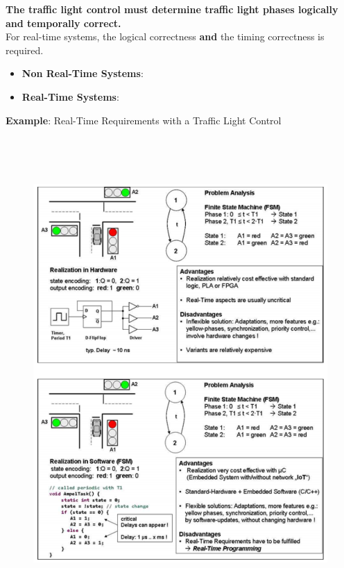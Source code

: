 \textbf{The traffic light control must determine traffic light phases logically and temporally correct.}\\

For real-time systems, the logical correctness \textbf{and} the timing correctness is required.

\begin{itemize}
	\item \textbf{Non Real-Time Systems}:  
	\item \textbf{Real-Time Systems}:    
\end{itemize}
\newpage

\textbf{Example}: Real-Time Requirements with a Traffic Light Control\\

\begin{figure}[h]
    \centering
    \includegraphics[width=17cm, height=18cm]{Images/image12.png}
    \label{fig:Fig 4}
\end{figure}

